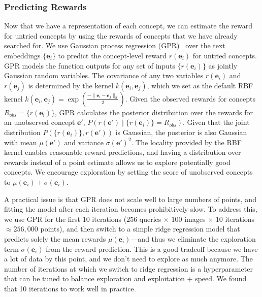 \subsubsection{Predicting Rewards}
Now that we have a representation of each concept, we can estimate the reward for untried concepts by using the rewards of concepts that we have already searched for.
We use Gaussian process regression (GPR)~\cite{williams1995gaussian} over the text embeddings $\{\mathbf{e}_i\}$ to predict the concept-level reward $r(\mathbf{e}_i)$ for untried concepts. 
GPR models the function outputs for any set of inputs $\{r(\mathbf{e}_i)\}$ as jointly Gaussian random variables. 
The covariance of any two variables $r(\mathbf{e}_i)$ and $r(\mathbf{e}_j)$ is determined by the kernel $k(\mathbf{e}_i, \mathbf{e}_j)$, which we set as the default RBF kernel $k(\mathbf{e}_i, \mathbf{e}_j) = \exp(\frac{-\|\mathbf{e}_i - \mathbf{e}_j\|_2}{2})$. 
Given the observed rewards for concepts $R_{obs} = \{r(\mathbf e_i)\}$, GPR calculates the posterior distribution over the rewards for an unobserved concept $\mathbf e'$, $P(r(\mathbf e') \mid \{r(\mathbf{e}_i)\} = R_{obs})$. Given that the joint distribution  $P(\{r(\mathbf{e}_i)\}, r(\mathbf{e}'))$ is Gaussian, the posterior is also Gaussian with mean $\mu(\mathbf e')$ and variance $\sigma{(\mathbf e')}^2$. The locality provided by the RBF kernel enables reasonable reward predictions, and having a distribution over rewards instead of a point estimate allows us to explore potentially good concepts. We encourage exploration by setting the score of unobserved concepts to $\mu(\mathbf{e}_i) + \sigma(\mathbf{e}_i)$.


A practical issue is that GPR does not scale well to large numbers of points, and fitting the model after each iteration becomes prohibitively slow. To address this, we use GPR for the first 10 iterations ($256$ queries $\times$ $100$ images $\times$ $10$ iterations $\approx 256{,}000$ points), and then switch to a simple ridge regression model that predicts solely the mean rewards $\mu(\mathbf{e}_i)$---and thus we eliminate the exploration term $\sigma(\mathbf{e}_i)$ from the reward prediction. This is a good tradeoff because we have a lot of data by this point, and we don't need to explore as much anymore.
The number of iterations at which we switch to ridge regression is a hyperparameter that can be tuned to balance exploration and exploitation + speed. We found that 10 iterations to work well in practice.



